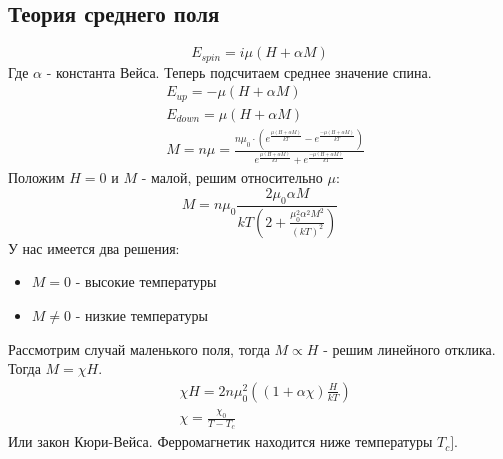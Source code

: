 \documentclass[a4paper, 12pt]{article}
\begin{document}
	\subsection{Теория среднего поля}
	\begin{equation*}
		E_{spin} = i \mu (H + \alpha M)
	\end{equation*}
	Где $\alpha$ - константа Вейса. Теперь подсчитаем среднее значение спина. 
	\begin{equation*}
		\begin{aligned}
			& E_{up} = - \mu (H + \alpha M)                                                                                                                                                          \\
			& E_{down} = \mu (H + \alpha M)                                                                                                                                                          \\
			& M = n \mu =\frac{ n \mu_{0} \cdot (  e^{\frac{\mu (H+ \alpha M)}{kT}}  -  e^{\frac{-\mu (H+ \alpha M)}{kT}})} {e^{\frac{\mu (H+ \alpha M)}{kT}}  +  e^{\frac{-\mu (H+ \alpha M)}{kT}}} 
		\end{aligned}
	\end{equation*}
	Положим $H=0$ и $M$ - малой, решим относительно $\mu$:
	\begin{equation*}
		M = n \mu_{0} \frac{2 \mu_{0} \alpha M}{kT(2+\frac{ \mu_{0} ^{2} \alpha^2 M^2}{(kT)^2}) }
	\end{equation*}
	У нас имеется два решения:
	\begin{itemize}
		\item $M = 0$ - высокие температуры
		\item $M \neq 0$ - низкие температуры
	\end{itemize}
	Рассмотрим случай маленького поля, тогда $M \propto H$ - решим линейного отклика. Тогда $M = \chi H$. 
	\begin{equation*}
		\begin{aligned}
			& \chi H = 2n \mu_{0}^{2} ( (1+\alpha \chi)\frac{H}{kT}) \\
			& \chi = \frac{\chi_{0}} {T-T_{c}}                       
		\end{aligned}
	\end{equation*}
	Или закон Кюри-Вейса.
	Ферромагнетик находится ниже температуры $T_{c}]$.
\end{document}
